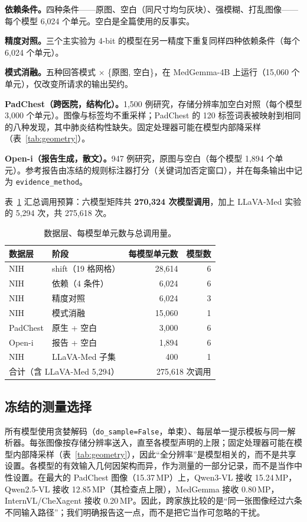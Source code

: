 \textbf{依赖条件。}四种条件——原图、空白（同尺寸均匀灰块）、强模糊、打乱图像——每个模型 6,024 个单元。空白是全篇使用的反事实。

\textbf{精度对照。}三个主实验为 4-bit 的模型在另一精度下重复同样四种依赖条件（每个 6,024 个单元）。

\textbf{模式消融。}五种回答模式 $\times$ \{原图, 空白\}，在 MedGemma-4B 上运行（15,060 个单元），仅改变所请求的输出契约。

\textbf{PadChest（跨医院，结构化）。}1,500 例研究，存储分辨率加空白对照（每个模型 3,000 个单元）。图像与标签均不重采样；PadChest 的 120 标签词表被映射到相同的八种发现，其中肺炎结构性缺失。固定处理器可能在模型内部降采样（表~\ref{tab:geometry}）。

\textbf{Open-i（报告生成，散文）。}947 例研究，原图与空白（每个模型 1,894 个单元）。参考报告由冻结的规则标注器打分（关键词加否定窗口），并在每条输出中记为 \texttt{evidence\_method}。

表~\ref{tab:calls} 汇总调用预算：六模型矩阵共 \textbf{270,324 次模型调用}，加上 LLaVA-Med 实验的 5,294 次，共 275,618 次。

\begin{table}[t]
\centering
\small
\caption{数据层、每模型单元数与总调用量。}
\label{tab:calls}
\begin{tabular}{llrr}
\toprule
数据层 & 阶段 & 每模型单元数 & 模型数 \\
\midrule
NIH & shift（19 格网格） & 28,614 & 6 \\
NIH & 依赖（4 条件） & 6,024 & 6 \\
NIH & 精度对照 & 6,024 & 3 \\
NIH & 模式消融 & 15,060 & 1 \\
PadChest & 原生 + 空白 & 3,000 & 6 \\
Open-i & 报告 + 空白 & 1,894 & 6 \\
NIH & LLaVA-Med 子集 & 400 & 1 \\
\midrule
\multicolumn{2}{l}{合计（含 LLaVA-Med 5,294）} & \multicolumn{2}{r}{275,618 次调用} \\
\bottomrule
\end{tabular}
\end{table}

\subsection{冻结的测量选择}

所有模型使用贪婪解码（\texttt{do\_sample=False}，单束）、每层单一提示模板与同一解析器。每张图像按存储分辨率送入，直至各模型声明的上限；固定处理器可能在模型内部降采样（表~\ref{tab:geometry}），因此``全分辨率''是模型相关的，而不是共享设置。各模型的有效输入几何因架构而异，作为测量的一部分记录，而不是当作中性设置。在最大的 PadChest 图像（15.37\,MP）上，Qwen3-VL 接收 15.24\,MP，Qwen2.5-VL 接收 12.85\,MP（其检查点上限），MedGemma 接收 0.80\,MP，InternVL/CheXagent 接收 0.20\,MP。因此，跨家族比较的是``同一张图像经过六条不同输入路径''；我们明确报告这一点，而不是把它当作可忽略的干扰。

